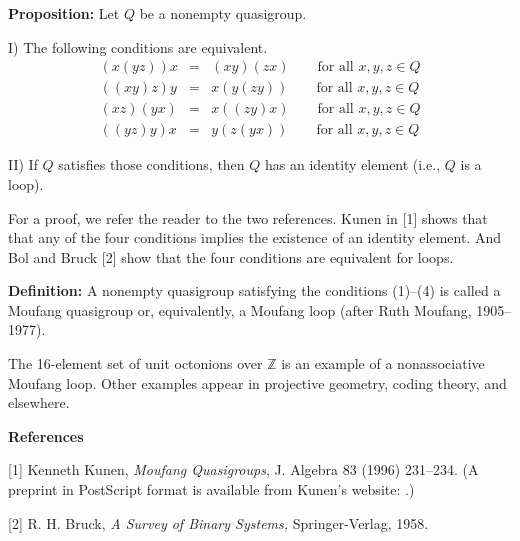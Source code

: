 \documentclass[12pt]{article}
\begin{document}
\textbf{Proposition: } Let $Q$ be a nonempty quasigroup.

I) The following conditions are equivalent.
\begin{eqnarray}
(x(yz))x &=& (xy)(zx) \qquad\text{for all } x,y,z\in Q \\
((xy)z)y &=& x(y(zy)) \qquad\text{for all } x,y,z\in Q \\
(xz)(yx) &=& x((zy)x) \qquad\text{for all } x,y,z\in Q \\
((yz)y)x &=& y(z(yx)) \qquad\text{for all } x,y,z\in Q
\end{eqnarray}

II) If $Q$ satisfies those conditions, then $Q$ has an identity element
(i.e., $Q$ is a loop).

For a proof, we refer the reader to the two references.
Kunen in [1] shows that that any of the four conditions implies the
existence of an identity element. And Bol and Bruck [2] show that
the four conditions are equivalent for loops.

\textbf{Definition:} A nonempty quasigroup satisfying the conditions
(1)--(4) is called a Moufang quasigroup or, equivalently, a Moufang
loop (after Ruth Moufang, 1905--1977).

The 16-element set of unit octonions over $\mathbb{Z}$ is an example
of a nonassociative Moufang loop.
Other examples appear in projective geometry, coding theory, and elsewhere.

\textbf{References}

[1] Kenneth Kunen, {\it Moufang Quasigroups}, J. Algebra 83 (1996) 231--234.
(A preprint in PostScript format is available from Kunen's website:
.)

[2] R. H. Bruck, {\it A Survey of Binary Systems,} Springer-Verlag, 1958.
\end{document}
